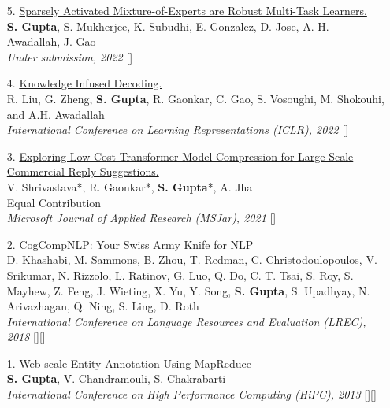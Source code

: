 \begin{itemize}[leftmargin=*]
    \item[5.] \underline{Sparsely Activated Mixture-of-Experts are Robust Multi-Task Learners.}\\ 
    \textbf{S. Gupta}, S. Mukherjee, K. Subudhi, E. Gonzalez, D. Jose, A. H. Awadallah, J. Gao\\
    \textit{Under submission, 2022}
    \hfill{[]}
    \vspace{1mm}
    \item[4.] \underline{Knowledge Infused Decoding.}\\ 
    R. Liu, G. Zheng, \textbf{S. Gupta}, R. Gaonkar, C. Gao, S. Vosoughi, M. Shokouhi, and A.H. Awadallah\\
    \textit{International Conference on Learning Representations (ICLR), 2022}
    \hfill{[]}
    \vspace{1mm}
    \item[3.] \underline{Exploring Low-Cost Transformer Model Compression for Large-Scale Commercial Reply Suggestions.}\\ 
    V. Shrivastava*, R. Gaonkar*, \textbf{S. Gupta}*, A. Jha\\
    {\small*Equal Contribution}\\
    \textit{Microsoft Journal of Applied Research (MSJar), 2021}
    \hfill{[]}
    \vspace{1mm}
    \item[2.] \underline{CogCompNLP: Your Swiss Army Knife for NLP}\\ 
    D. Khashabi, M. Sammons, B. Zhou, T. Redman, C. Christodoulopoulos, V. Srikumar, N. Rizzolo, L. Ratinov, G. Luo, Q. Do, C. T. Tsai, S. Roy, S. Mayhew, Z. Feng, J. Wieting, X. Yu, Y. Song, \textbf{S. Gupta}, S. Upadhyay, N. Arivazhagan, Q. Ning, S. Ling, D. Roth\\
    \textit{International Conference on Language Resources and Evaluation (LREC), 2018}
    \hfill{[][]}
    \item[1.] \underline{Web-scale Entity Annotation Using MapReduce}\\ 
    \textbf{S. Gupta}, V. Chandramouli, S. Chakrabarti\\
    \textit{International Conference on High Performance Computing (HiPC), 2013}
    \hfill{[][]}
\end{itemize}
